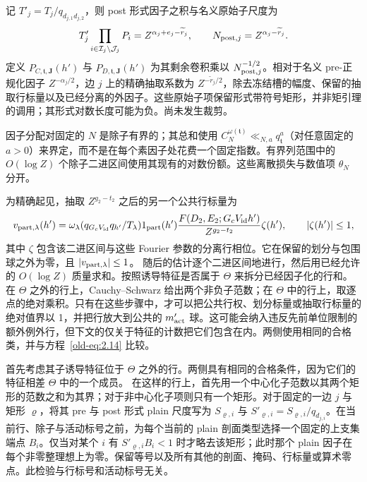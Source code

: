 \documentclass[11pt,a4paper]{article}
\numberwithin{equation}{section}
\numberwithin{figure}{section}
\theoremstyle{definition}
\theoremstyle{remark}
\begin{document}
记 \(T'_j=T_j/q_{d_{j,1}d_{j,2}}\)，则 post 形式因子之积与名义原始子尺度为
\begin{equation}
 T'_j\prod_{i\in\mathcal I_j\setminus\mathcal J_j}P_i
   =Z^{\alpha_j+e_j-\widetilde r_j},\qquad
 N_{{\rm post},j}=Z^{\alpha_j-\widetilde r_j}.
 \label{eq:centered-raw-normalization}
\end{equation}
定义 \(P_{C,\mathfrak t,\mathbf J}(h')\) 与
\(P_{D,\mathfrak t,\mathbf J}(h')\) 为其剩余卷积乘以 \(N_{{\rm post},j}^{-1/2}\)。相对于名义 pre-正规化因子 \(Z^{-\alpha_j/2}\)，边 \(j\) 上的精确抽取系数为 \(Z^{-\widetilde r_j/2}\)，除去冻结槽的幅度、保留的抽取行标量以及已经分离的外因子。这些原始子项保留形式带符号矩形，并非矩引理的调用；其形式对数长度可能为负。尚未发生裁剪。

因子分配对固定的 \(N\) 是除子有界的；其总和使用 \(C_N^{\omega(\mathfrak t)}
\ll_{N,a}q_{\mathfrak t}^a\)（对任意固定的 \(a>0\)）来界定，而不是在每个素因子处花费一个固定指数。有界列范围中的 \(O(\log Z)\) 个除子二进区间使用其现有的对数份额。这些离散损失与数值项 \(\theta_N\) 分开。

为精确起见，抽取 \(Z^{g_2-t_2}\) 之后的另一个公共行标量为
\[
 v_{{\rm part},\lambda}(h')=
 \omega_\lambda(q_{G_cV_{\rm id}}q_{h'}/T_\lambda)
 1_{\rm part}(h')
 \frac{F(D_2,E_2;G_cV_{\rm id}h')}{Z^{g_2-t_2}}\zeta(h'),
 \qquad |\zeta(h')|\le1,
\]
其中 \(\zeta\) 包含该二进区间与这些 Fourier 参数的分离行相位。它在保留的划分与包围球之外为零，且 \(|v_{{\rm part},\lambda}|\le1\)。
随后的估计逐个二进区间地进行，然后用已经允许的 \(O(\log Z)\) 质量求和。按照诱导特征是否属于 \(\Theta\) 来拆分已经因子化的行和。在 \(\Theta\) 之外的行上，Cauchy--Schwarz 给出两个非负子范数；在 \(\Theta\) 中的行上，取逐点的绝对乘积。只有在这些步骤中，才可以把公共行权、划分标量或抽取行标量的绝对值界以 1，并把行放大到公共的 \(m'_{\rm act}\) 球。这可能会纳入违反先前单位限制的额外例外行，但下文的仅关于特征的计数把它们包含在内。两侧使用相同的合格类，并与方程~\eqref{old-eq:2.14} 比较。

首先考虑其子诱导特征位于 \(\Theta\) 之外的行。两侧具有相同的合格条件，因为它们的特征相差 \(\Theta\) 中的一个成员。
在这样的行上，首先用一个中心化子范数以其两个矩形的范数之和为其界；对于非中心化子项则只有一个矩形。对于固定的一边 \(j\) 与矩形 \(\varrho\)，将其 pre 与 post 形式 plain 尺度写为 \(S_{\varrho,i}\) 与 \(S'_{\varrho,i}=S_{\varrho,i}/q_{d_{j,i}}\)。在当前行、除子与活动标号之前，为每个当前的 plain 剖面类型选择一个固定的上支集端点 \(B_i\)。仅当对某个 \(i\) 有 \(S'_{\varrho,i}B_i<1\) 时才略去该矩形；此时那个 plain 因子在每个非零整理想上为零。保留等号以及所有其他的剖面、掩码、行标量或算术零点。此检验与行标号和活动标号无关。
\end{document}
